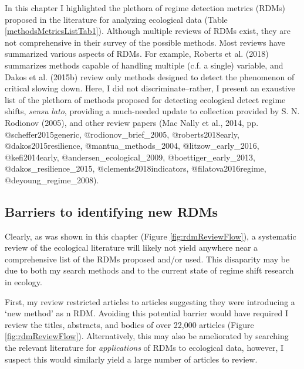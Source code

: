 \documentclass[12pt,twoside,openany]{reedthesis}
\begin{document}
In this chapter I highlighted the plethora of regime detection metrics (RDMs) proposed in the literature for analyzing ecological data (Table \ref{methodsMetricsListTab1}). Although multiple reviews of RDMs exist, they are not comprehensive in their survey of the possible methods. Most reviews have summarized various aspects of RDMs. For example, Roberts et al. (2018) summarizes methods capable of handling multiple (c.f. a single) variable, and Dakos et al. (2015b) review only methods designed to detect the phenomenon of critical slowing down. Here, I did not discriminate--rather, I present an exaustive list of the plethora of methods proposed for detecting ecological detect regime shifts, \emph{sensu lato}, providing a much-needed update to collection provided by S. N. Rodionov (2005), and other review papers (Mac Nally et al., 2014, pp. @scheffer2015generic, @rodionov\_brief\_2005, @roberts2018early, @dakos2015resilience, @mantua\_methods\_2004, @litzow\_early\_2016, @kefi2014early, @andersen\_ecological\_2009, @boettiger\_early\_2013, @dakos\_resilience\_2015, @clements2018indicators, @filatova2016regime, @deyoung\_regime\_2008).

\hypertarget{barriers-to-identifying-new-rdms}{%
\subsection{Barriers to identifying new RDMs}\label{barriers-to-identifying-new-rdms}}

Clearly, as was shown in this chapter (Figure \ref{fig:rdmReviewFlow}), a systematic review of the ecological literature will likely not yield anywhere near a comprehensive list of the RDMs proposed and/or used. This disaparity may be due to both my search methods and to the current state of regime shift research in ecology.

First, my review restricted articles to articles suggesting they were introducing a `new method' as n RDM. Avoiding this potential barrier would have required I review the titles, abstracts, and bodies of over 22,000 articles (Figure \ref{fig:rdmReviewFlow}). Alternatively, this may also be ameliorated by searching the relevant literature for \emph{applications} of RDMs to ecological data, however, I suspect this would similarly yield a large number of articles to review.
\end{document}
